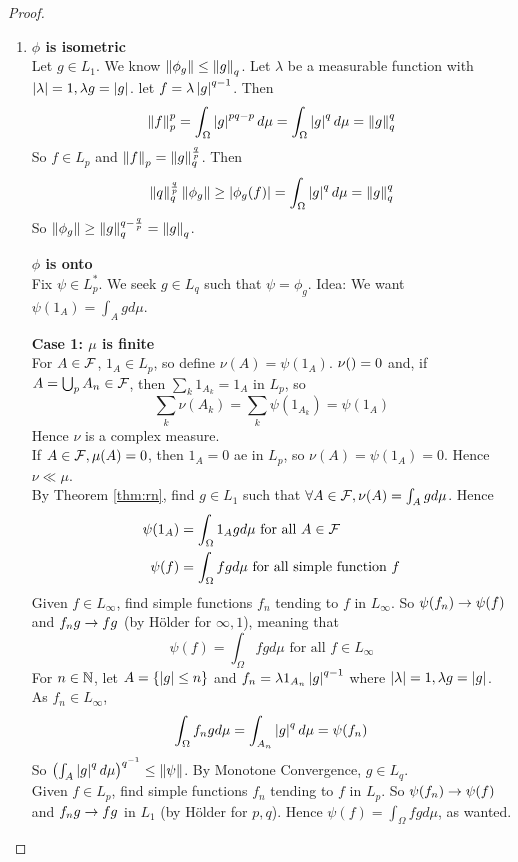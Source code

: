 \documentclass{article}
\begin{document}
\begin{proof}~
  \begin{enumerate}
    \item {\bf $\phi$ is isometric} \\
    Let $g \in L_1$. We know $\left\lVert \phi_g\right\rVert \le \left\lVert g\right\rVert_q$. Let $\lambda$ be a measurable function with $\left\lvert \lambda\right\rvert = 1, \lambda g = \left\lvert g\right\rvert$. let $f = \lambda\left\lvert g\right\rvert^{q - 1}$. Then
    $$\left\lVert f\right\rVert_p^p = \int_\Omega \left\lvert g\right\rvert^{pq - p} d\mu = \int_\Omega \left\lvert g\right\rvert^q d\mu = \left\lVert g\right\rVert_q^q$$
    So $f \in L_p$ and $\left\lVert f\right\rVert_p = \left\lVert g\right\rVert_q^{\frac qp}$. Then
    $$\left\lVert q\right\rVert_q^{\frac qp}\left\lVert \phi_g\right\rVert \ge \left\lvert \phi_g(f)\right\rvert = \int_\Omega \left\lvert g\right\rvert^q d\mu = \left\lVert g\right\rVert_q^q$$
    So $\left\lVert \phi_g\right\rVert \ge \left\lVert g\right\rVert_q^{q - \frac qp} = \left\lVert g\right\rVert_q$.

    {\bf $\phi$ is onto} \\
    Fix $\psi \in L_p^*$. We seek $g \in L_q$ such that $\psi = \phi_g$. Idea: We want $\psi(1_A) = \int_A g d\mu$.

    {\bf Case 1: $\mu$ is finite} \\
    For $A \in \mathcal F$, $1_A \in L_p$, so define $\nu(A) = \psi(1_A)$. $\nu(\empty) = 0$ and, if $A = \bigcup_p A_n \in \mathcal F$, then $\sum_k 1_{A_k} = 1_A$ in $L_p$, so
    $$\sum_k \nu(A_k) = \sum_k \psi(1_{A_k}) = \psi(1_A)$$
    Hence $\nu$ is a complex measure. \\
    If $A \in \mathcal F, \mu(A) = 0$, then $1_A = 0$ ae in $L_p$, so $\nu(A) = \psi(1_A) = 0$. Hence $\nu \ll \mu$. \\
    By Theorem \ref{thm:rn}, find $g \in L_1$ such that $\forall A \in \mathcal F, \nu(A) = \int_A g d\mu$. Hence
    \begin{align*}
      \psi(1_A) & = \int_\Omega 1_A g d\mu \text{ for all } A \in \mathcal F \\
      \psi(f) & = \int_\Omega fg d\mu \text{ for all simple function } f
    \end{align*}
    Given $f \in L_\infty$, find simple functions $f_n$ tending to $f$ in $L_\infty$. So $\psi(f_n) \rightarrow \psi(f)$ and $f_ng \rightarrow fg$ (by Hölder for $\infty, 1$), meaning that
    $$\psi(f) = \int_\Omega fg d\mu \text{ for all } f \in L_\infty$$
    For $n \in \mathbb N$, let $A = \{\left\lvert g\right\rvert \le n\}$ and $f_n = \lambda 1_{A_n} \left\lvert g\right\rvert^{q - 1}$ where $\left\lvert \lambda\right\rvert = 1, \lambda g = \left\lvert g\right\rvert$. As $f_n \in L_\infty$,
    $$\int_\Omega f_ng d\mu = \int_{A_n} \left\lvert g\right\rvert^q d\mu = \psi(f_n)$$
    So $\left(\int_A \left\lvert g\right\rvert^q d\mu\right)^{q^{-1}} \le \left\lVert \psi\right\rVert$. By Monotone Convergence, $g \in L_q$. \\
    Given $f \in L_p$, find simple functions $f_n$ tending to $f$ in $L_p$. So $\psi(f_n) \rightarrow \psi(f)$ and $f_ng \rightarrow fg$ in $L_1$ (by Hölder for $p, q$). Hence $\psi(f) = \int_\Omega fg d\mu$, as wanted.


\end{enumerate}
\end{proof}
\end{document}
